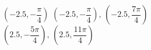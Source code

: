 { $\left( -2.5, -\dfrac{\pi}{4} \right)$ }
{$\left( -2.5, -\dfrac{\pi}{4} \right), \, \left( -2.5, \dfrac{7\pi}{4} \right)$\\$\left( 2.5, -\dfrac{5\pi}{4} \right), \, \left( 2.5, \dfrac{11\pi}{4} \right)$\\ }

